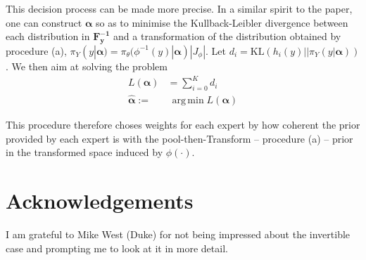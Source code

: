 \documentclass[a4paper, notitlepage, 10pt]{article}
\DeclareMathOperator*{\argmin}{arg\,min}
\begin{document}
This decision process can be made more precise.
In a similar spirit to the paper, one can construct $\boldsymbol\alpha$ so as to minimise the Kullback-Leibler divergence between each distribution in $\mathbf{F^{-1}_y}$ and a transformation of the distribution obtained by procedure (a), $\pi_{Y}(y | \boldsymbol\alpha) = \pi_{\theta}( \phi^{-1}(y)| \boldsymbol\alpha)|J_\phi|$.
Let $d_i = \text{KL}( h_i(y) || \pi_{Y}(y | \boldsymbol\alpha))$.
We then aim at solving the problem
\begin{align}
L(\boldsymbol\alpha) &= \sum_{i=0}^Kd_i \\
     \hat{\boldsymbol\alpha}:=& \:\argmin L(\boldsymbol\alpha)  \nonumber
\end{align}

This procedure therefore choses weights for each expert by how coherent the prior provided by each expert is with the pool-then-Transform -- procedure (a) -- prior in the transformed space induced by $\phi(\cdot)$.


\section*{Acknowledgements}

I am grateful to Mike West (Duke) for not being impressed about the invertible case and prompting me to look at it in more detail.


\end{document}
